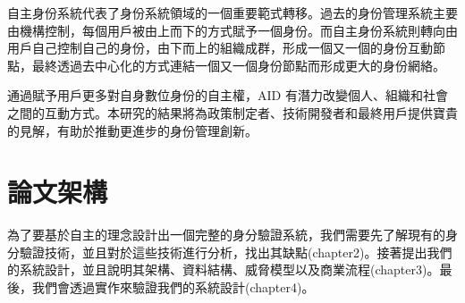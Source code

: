 自主身份系統代表了身份系統領域的一個重要範式轉移。過去的身份管理系統主要由機構控制，每個用戶被由上而下的方式賦予一個身份。而自主身份系統則轉向由用戶自己控制自己的身份，由下而上的組織成群，形成一個又一個的身份互動節點，最終透過去中心化的方式連結一個又一個身份節點而形成更大的身份網絡。

通過賦予用戶更多對自身數位身份的自主權，AID 有潛力改變個人、組織和社會之間的互動方式。本研究的結果將為政策制定者、技術開發者和最終用戶提供寶貴的見解，有助於推動更進步的身份管理創新。

\section{論文架構}

為了要基於自主的理念設計出一個完整的身分驗證系統，我們需要先了解現有的身分驗證技術，並且對於這些技術進行分析，找出其缺點(chapter2)。接著提出我們的系統設計，並且說明其架構、資料結構、威脅模型以及商業流程(chapter3)。最後，我們會透過實作來驗證我們的系統設計(chapter4)。\newpage